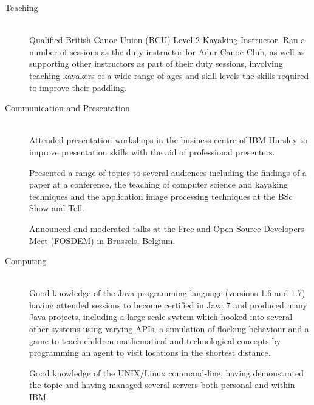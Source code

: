 \documentclass[letterpaper,11pt]{article}
\begin{document}
\vspace{-16pt}
\begin{description}
\item[Teaching] \hfill \\
Qualified British Canoe Union (BCU) Level 2 Kayaking Instructor. Ran a number of sessions as the duty instructor for Adur Canoe Club, as well as supporting other instructors as part of their duty sessions, involving teaching kayakers of a wide range of ages and skill levels the skills required to improve their paddling.

\item[Communication and Presentation] \hfill \\
Attended presentation workshops in the business centre of IBM Hursley to improve presentation skills with the aid of professional presenters.

Presented a range of topics to several audiences including the findings of a paper at a conference, the teaching of computer science and kayaking techniques and the application image processing techniques at the BSc Show and Tell.

Announced and moderated talks at the Free and Open Source Developers Meet (FOSDEM) in Brussels, Belgium.

\item[Computing] \hfill \\
Good knowledge of the Java programming language (versions 1.6 and 1.7) having attended sessions to become certified in Java 7 and produced many Java projects, including a large scale system which hooked into several other systems using varying APIs, a simulation of flocking behaviour and a game to teach children mathematical and technological concepts by programming an agent to visit locations in the shortest distance.

Good knowledge of the UNIX/Linux command-line, having demonstrated the topic and having managed several servers both personal and within IBM.

\end{description}

\end{document}
